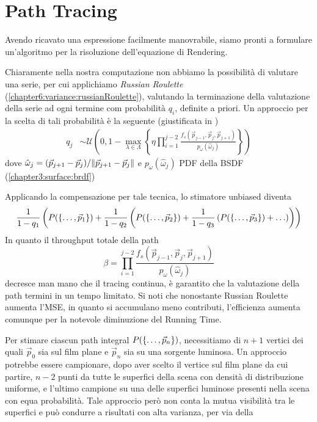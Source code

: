 \section{Path Tracing}
Avendo ricavato una espressione facilmente manovrabile, siamo pronti a formulare un'algoritmo per la risoluzione dell'equazione di Rendering.\par
Chiaramente nella nostra computazione non abbiamo la possibilit\`a di valutare una serie, per cui applichiamo \textit{Russian Roulette} 
(\ref{chapter6:variance:russianRoulette}), valutando la terminazione della valutazione della serie ad ogni termine com probabilit\`a $q_i$, definite 
a priori. Un approccio per la scelta di tali probabilit\`a \`e la seguente (giustificata in \cite{pharr})
\begin{align}
	q_j&\sim\mathcal{U}\left(0,1-\max_{\lambda\in\Lambda}\left\{
		\eta\prod_{i=1}^{j-2}\frac{f_s(\vec{p}_{j-1},\vec{p}_j,\vec{p}_{j+1})}{p_\omega(\hat{\omega}_j)}\right\}\right)
\end{align}
dove $\hat{\omega}_j=(\vec{p}_{j+1}-\vec{p}_j)/\norm{\vec{p}_{j+1}-\vec{p}_j}$ e $p_\omega(\hat{\omega}_j)$ PDF della BSDF 
(\ref{chapter3:surface:brdf})\par
Applicando la compensazione per tale tecnica, lo stimatore unbiased diventa
\begin{equation}
	\frac{1}{1-q_1}\left(P(\{\ldots,\vec{p}_{1}\})+\frac{1}{1-q_2}\left(P(\{\ldots,\vec{p}_{2}\})+\frac{1}{1-q_3}\left(P(\{\ldots,\vec{p}_{3}\})+\ldots\right)\right)\right)
\end{equation}
In quanto il throughput totale della path
\begin{equation*}
	\beta=\prod_{i=1}^{j-2}\frac{f_s(\vec{p}_{j-1},\vec{p}_j,\vec{p}_{j+1})}{p_\omega(\hat{\omega}_j)}
\end{equation*}
decresce man mano che il tracing continua, \`e garantito che la valutazione della path termini in un tempo limitato. Si noti che nonostante Russian
Roulette aumenta l'MSE, in quanto si accumulano meno contributi, l'efficienza aumenta comunque per la notevole diminuzione del Running Time.\par
Per stimare ciascun path integral $P(\{\ldots,\vec{p}_{n}\})$, necessitiamo di $n+1$ vertici dei quali $\vec{p}_0$ sia sul film plane e $\vec{p}_n$ sia su una 
sorgente luminosa. Un approccio potrebbe essere campionare, dopo aver scelto il vertice sul film plane da cui partire, $n-2$ punti da tutte le 
superfici della scena con densit\`a di distribuzione uniforme, e l'ultimo campione su una delle superfici luminose presenti nella scena con equa
probabilit\`a. Tale approccio per\`o non conta la mutua visibilit\`a tra le superfici e pu\`o condurre a risultati con alta varianza, per via della 
